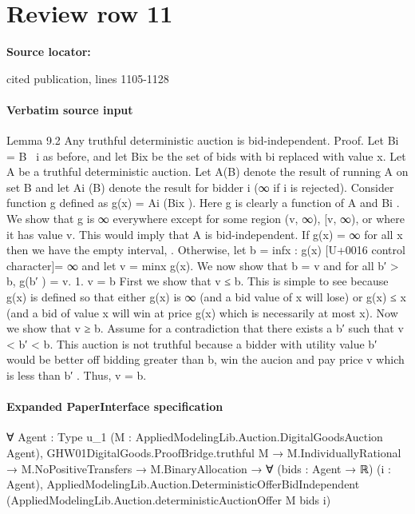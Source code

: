 \documentclass[10pt]{article}
\begin{document}
\section*{Review row 11}
\textbf{Source locator:} {\footnotesize\raggedright cited publication, lines 1105-\allowbreak{}1128\par}
\paragraph{Verbatim source input}
\begin{ReviewVerbatim}
Lemma 9.2 Any truthful deterministic auction is
bid-independent.
Proof. Let Bi = B \ {i} as before, and let Bix be
the set of bids with bi replaced with value x. Let
A be a truthful deterministic auction. Let A(B) denote the result of running A on set B and let Ai (B)
denote the result for bidder i (∞ if i is rejected).
Consider function g defined as g(x) = Ai (Bix ). Here
g is clearly a function of A and Bi . We show that
g is ∞ everywhere except for some region (v, ∞),
[v, ∞), or {} where it has value v. This would imply that A is bid-independent. If g(x) = ∞ for all x
then we have the empty interval, {}. Otherwise, let
b = inf{x : g(x) [U+0016 control character]= ∞} and let v = minx g(x). We
now show that b = v and for all b′ > b, g(b′ ) = v.
1. v = b
First we show that v ≤ b. This is simple to see
because g(x) is defined so that either g(x) is ∞
(and a bid value of x will lose) or g(x) ≤ x (and
a bid of value x will win at price g(x) which is
necessarily at most x).
Now we show that v ≥ b. Assume for a contradiction that there exists a b′ such that v < b′ < b.
This auction is not truthful because a bidder
with utility value b′ would be better off bidding
greater than b, win the aucion and pay price v
which is less than b′ . Thus, v = b.
\end{ReviewVerbatim}



\paragraph{Expanded PaperInterface specification}
\begin{ReviewVerbatim}
∀ {Agent : Type u_1} (M : AppliedModelingLib.Auction.DigitalGoodsAuction Agent),
  GHW01DigitalGoods.ProofBridge.truthful M →
    M.IndividuallyRational →
      M.NoPositiveTransfers →
        M.BinaryAllocation →
          ∀ (bids : Agent → ℝ) (i : Agent),
            AppliedModelingLib.Auction.DeterministicOfferBidIndependent
              (AppliedModelingLib.Auction.deterministicAuctionOffer M bids i)
\end{ReviewVerbatim}
\end{document}
